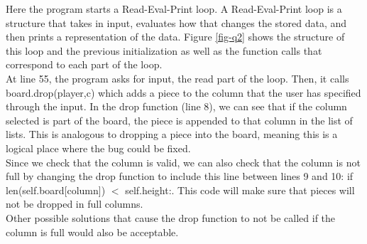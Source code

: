Here the program starts a Read-Eval-Print loop. A Read-Eval-Print loop is a structure that takes in input, evaluates how that changes the stored data, and then prints a representation of the data. Figure \ref{fig-q2} shows the structure of this loop and the previous initialization as well as the function calls that correspond to each part of the loop.\\

At line 55, the program asks for input, the read part of the loop.
Then, it calls board.drop(player,c) which adds a piece to the column that the user has specified through the input.
In the drop function (line 8), we can see that if the column selected is part of the board,
	the piece is appended to that column in the list of lists.
This is analogous to dropping a piece into the board, meaning this is a logical place where the bug could be fixed.\\

Since we check that the column is valid,
we can also check that the column is not full by changing the drop function to include this line between lines 9 and 10:
if len(self.board[column]) $<$ self.height:.
This code will make sure that pieces will not be dropped in full columns.\\

Other possible solutions that cause the drop function to not be called if the column is full would also be acceptable.

\newpage
